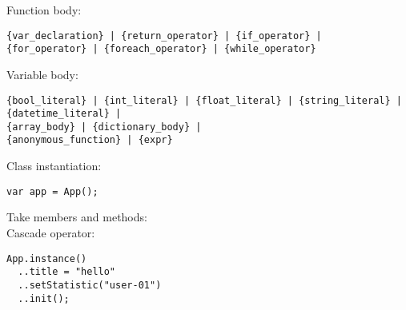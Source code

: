 \documentclass[a4paper,12pt]{book}
\begin{document}
\begin{verbatim}
\end{verbatim}

Function body:\\

\begin{verbatim}
{var_declaration} | {return_operator} | {if_operator} |
{for_operator} | {foreach_operator} | {while_operator}
\end{verbatim}

Variable body:\\

\begin{verbatim}
{bool_literal} | {int_literal} | {float_literal} | {string_literal} |
{datetime_literal} |
{array_body} | {dictionary_body} | 
{anonymous_function} | {expr}
\end{verbatim}

Class instantiation:\\

\begin{verbatim}
var app = App();
\end{verbatim}

Take members and methods:\\

Cascade operator:

\begin{verbatim}
App.instance()
  ..title = "hello"
  ..setStatistic("user-01")
  ..init();
\end{verbatim}
\end{document}
